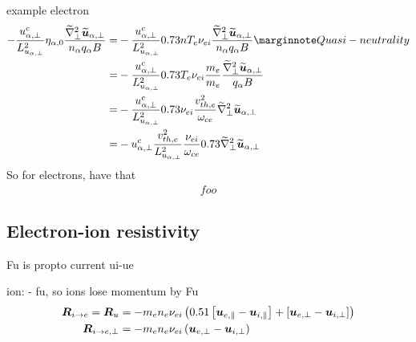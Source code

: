 %
example electron
%
\begin{align*}
- \frac{u^c_{\a,\perp}}{L_{u_{\a,\perp}}^2}
\eta_{\a,0}
\frac{ \wt{\grad}_\perp^2\wt{\ve{u}}_{\a,\perp} }{n_\a  q_\a B}
=&
- \frac{u^c_{\a,\perp}}{L_{u_{\a,\perp}}^2}
0.73nT_e\nu_{ei}
\frac{ \wt{\grad}_\perp^2\wt{\ve{u}}_{\a,\perp} }{n_\a  q_\a B}
\note{Quasi-neutrality}
\\
%
%
=&
- \frac{u^c_{\a,\perp}}{L_{u_{\a,\perp}}^2}
0.73T_e\nu_{ei}\frac{m_e}{m_e}
\frac{ \wt{\grad}_\perp^2\wt{\ve{u}}_{\a,\perp} }{q_\a B}
\\
%
%
=&
- \frac{u^c_{\a,\perp}}{L_{u_{\a,\perp}}^2}
0.73\nu_{ei}\frac{v_{th,e}^2}{\om_{ce}}
\wt{\grad}_\perp^2\wt{\ve{u}}_{\a,\perp}
\\
%
%
=&
-
u^c_{\a,\perp}
\frac{v_{th,e}^2}{L_{u_{\a,\perp}}^2}
\frac{\nu_{ei}}{\om_{ce}}
0.73
\wt{\grad}_\perp^2\wt{\ve{u}}_{\a,\perp}
\end{align*}
%
So for electrons, have that
%
\begin{align*}
 foo
\end{align*}

\subsection{Electron-ion resistivity}
Fu is propto current ui-ue

ion: - fu, so ions lose momentum by Fu
\begin{align}
    \boldsymbol{R}_{i \to e}
    = \boldsymbol{R}_{u}
   &= -m_en_e\nu_{ei}\left(0.51\left[\boldsymbol{u}_{e,\|}-\boldsymbol{u}_{i,\|}\right] +
      \left[\boldsymbol{u}_{e,\perp}-\boldsymbol{u}_{i,\perp}\right]\right)
      \\
    \boldsymbol{R}_{i \to e,\perp}
   &= -m_en_e\nu_{ei}\left(\boldsymbol{u}_{e,\perp}-\boldsymbol{u}_{i,\perp}\right)
\end{align}
